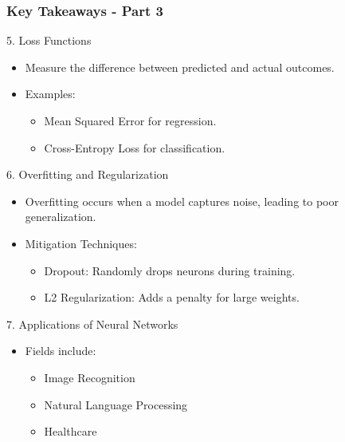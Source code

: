 \documentclass[aspectratio=169]{beamer}
\begin{document}
\begin{frame}[fragile]
    \frametitle{Key Takeaways - Part 3}
    \begin{block}{5. Loss Functions}
        \begin{itemize}
            \item Measure the difference between predicted and actual outcomes.
            \item Examples:
            \begin{itemize}
                \item Mean Squared Error for regression.
                \item Cross-Entropy Loss for classification.
            \end{itemize}
        \end{itemize}
    \end{block}
    
    \begin{block}{6. Overfitting and Regularization}
        \begin{itemize}
            \item Overfitting occurs when a model captures noise, leading to poor generalization.
            \item Mitigation Techniques:
            \begin{itemize}
                \item Dropout: Randomly drops neurons during training.
                \item L2 Regularization: Adds a penalty for large weights.
            \end{itemize}
        \end{itemize}
    \end{block} 

    \begin{block}{7. Applications of Neural Networks}
        \begin{itemize}
            \item Fields include:
            \begin{itemize}
                \item Image Recognition
                \item Natural Language Processing
                \item Healthcare
            \end{itemize}
        \end{itemize}
    \end{block}
\end{frame}
\end{document}
